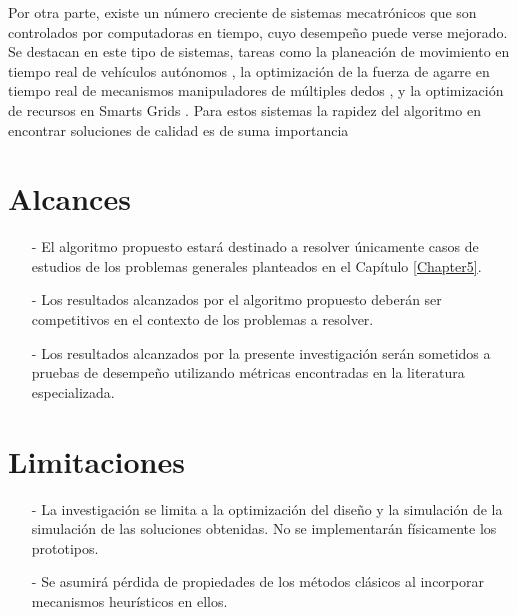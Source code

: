 Por otra parte, existe un número creciente de sistemas mecatrónicos que son controlados por computadoras en tiempo, cuyo desempeño puede verse mejorado. Se destacan en este tipo de sistemas, tareas como la planeación de movimiento en tiempo real de vehículos autónomos \cite{frazzoli_real-time_2002},  la optimización de la fuerza de agarre en tiempo real  de mecanismos manipuladores de múltiples dedos \cite{liu_real-time_2004}, y la optimización de recursos en Smarts Grids \cite{oe_what_2014} \cite{ahat_smart_2013} \cite{opusone_gridos_2015}. Para estos sistemas la rapidez del algoritmo en encontrar soluciones de calidad es de suma importancia
  \section{Alcances}
  \begin{itemize}
  	\item[-] El algoritmo propuesto estará destinado a resolver únicamente casos de estudios de los problemas generales planteados en el Capítulo \ref{Chapter5}.
  	\item[-] Los resultados alcanzados por el algoritmo propuesto deberán ser competitivos en el contexto de los problemas a resolver.
  	\item [-] Los resultados alcanzados por la presente investigación serán sometidos a pruebas de desempeño utilizando métricas encontradas en la literatura especializada.
  	
  \end{itemize}
  
  \section{Limitaciones}
  \begin{itemize}
  	\item[-] La investigación se limita a la optimización del diseño y la simulación de la simulación de las soluciones obtenidas. No se implementarán físicamente los prototipos.
  	\item[-] Se asumirá pérdida de propiedades de los métodos clásicos al incorporar mecanismos heurísticos en ellos. 
  	
  \end{itemize}


